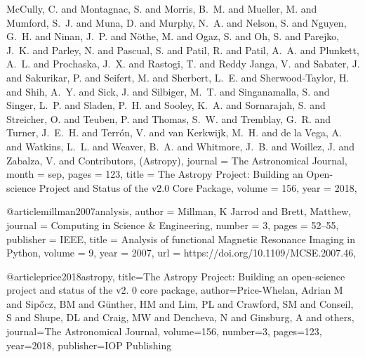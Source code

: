 {{                   {McCully}, C. and {Montagnac}, S. and {Morris}, B.~M. and
                   {Mueller}, M. and {Mumford}, S.~J. and {Muna}, D. and
                   {Murphy}, N.~A. and {Nelson}, S. and {Nguyen}, G.~H. and
                   {Ninan}, J.~P. and {N{\"o}the}, M. and {Ogaz}, S. and
                   {Oh}, S. and {Parejko}, J.~K. and {Parley}, N. and
                   {Pascual}, S. and {Patil}, R. and {Patil}, A.~A. and
                   {Plunkett}, A.~L. and {Prochaska}, J.~X. and
                   {Rastogi}, T. and {Reddy Janga}, V. and {Sabater}, J. and
                   {Sakurikar}, P. and {Seifert}, M. and
                   {Sherbert}, L.~E. and {Sherwood-Taylor}, H. and
                   {Shih}, A.~Y. and {Sick}, J. and {Silbiger}, M.~T. and
                   {Singanamalla}, S. and {Singer}, L.~P. and
                   {Sladen}, P.~H. and {Sooley}, K.~A. and
                   {Sornarajah}, S. and {Streicher}, O. and {Teuben}, P. and
                   {Thomas}, S.~W. and {Tremblay}, G.~R. and
                   {Turner}, J.~E.~H. and {Terr{\'o}n}, V. and
                   {van Kerkwijk}, M.~H. and {de la Vega}, A. and
                   {Watkins}, L.~L. and {Weaver}, B.~A. and
                   {Whitmore}, J.~B. and {Woillez}, J. and {Zabalza}, V. and
                   {Contributors}, (Astropy)},
  journal =       {The Astronomical Journal},
  month =         sep,
  pages =         {123},
  title =         {{The Astropy Project: Building an Open-science
                   Project and Status of the v2.0 Core Package}},
  volume =        {156},
  year =          {2018},
}

@article{millman2007analysis,
  author =        {Millman, K Jarrod and Brett, Matthew},
  journal =       {Computing in Science \& Engineering},
  number =        {3},
  pages =         {52--55},
  publisher =     {IEEE},
  title =         {Analysis of functional {Magnetic Resonance Imaging}
                   in {P}ython},
  volume =        {9},
  year =          {2007},
  url =           {https://doi.org/10.1109/MCSE.2007.46},
}

@article{price2018astropy,
  title={The Astropy Project: Building an open-science project and status of the v2. 0 core package},
  author={Price-Whelan, Adrian M and Sip{\H{o}}cz, BM and G{\"u}nther, HM and Lim, PL and Crawford, SM and Conseil, S and Shupe, DL and Craig, MW and Dencheva, N and Ginsburg, A and others},
  journal={The Astronomical Journal},
  volume={156},
  number={3},
  pages={123},
  year={2018},
  publisher={IOP Publishing}
}

